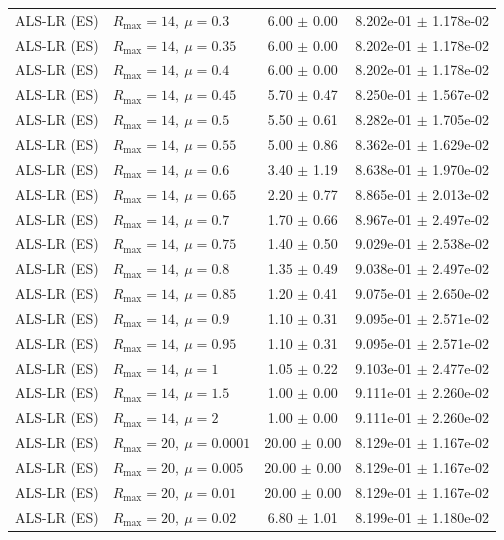 \begin{table}[t]
\begin{tabular}{@{}llcc@{}}
ALS-LR (ES) & \(R_{\max}=14,\ \mu=0.3\) & 6.00 $\pm$ 0.00 & 8.202e-01 $\pm$ 1.178e-02 \\
ALS-LR (ES) & \(R_{\max}=14,\ \mu=0.35\) & 6.00 $\pm$ 0.00 & 8.202e-01 $\pm$ 1.178e-02 \\
ALS-LR (ES) & \(R_{\max}=14,\ \mu=0.4\) & 6.00 $\pm$ 0.00 & 8.202e-01 $\pm$ 1.178e-02 \\
ALS-LR (ES) & \(R_{\max}=14,\ \mu=0.45\) & 5.70 $\pm$ 0.47 & 8.250e-01 $\pm$ 1.567e-02 \\
ALS-LR (ES) & \(R_{\max}=14,\ \mu=0.5\) & 5.50 $\pm$ 0.61 & 8.282e-01 $\pm$ 1.705e-02 \\
ALS-LR (ES) & \(R_{\max}=14,\ \mu=0.55\) & 5.00 $\pm$ 0.86 & 8.362e-01 $\pm$ 1.629e-02 \\
ALS-LR (ES) & \(R_{\max}=14,\ \mu=0.6\) & 3.40 $\pm$ 1.19 & 8.638e-01 $\pm$ 1.970e-02 \\
ALS-LR (ES) & \(R_{\max}=14,\ \mu=0.65\) & 2.20 $\pm$ 0.77 & 8.865e-01 $\pm$ 2.013e-02 \\
ALS-LR (ES) & \(R_{\max}=14,\ \mu=0.7\) & 1.70 $\pm$ 0.66 & 8.967e-01 $\pm$ 2.497e-02 \\
ALS-LR (ES) & \(R_{\max}=14,\ \mu=0.75\) & 1.40 $\pm$ 0.50 & 9.029e-01 $\pm$ 2.538e-02 \\
ALS-LR (ES) & \(R_{\max}=14,\ \mu=0.8\) & 1.35 $\pm$ 0.49 & 9.038e-01 $\pm$ 2.497e-02 \\
ALS-LR (ES) & \(R_{\max}=14,\ \mu=0.85\) & 1.20 $\pm$ 0.41 & 9.075e-01 $\pm$ 2.650e-02 \\
ALS-LR (ES) & \(R_{\max}=14,\ \mu=0.9\) & 1.10 $\pm$ 0.31 & 9.095e-01 $\pm$ 2.571e-02 \\
ALS-LR (ES) & \(R_{\max}=14,\ \mu=0.95\) & 1.10 $\pm$ 0.31 & 9.095e-01 $\pm$ 2.571e-02 \\
ALS-LR (ES) & \(R_{\max}=14,\ \mu=1\) & 1.05 $\pm$ 0.22 & 9.103e-01 $\pm$ 2.477e-02 \\
ALS-LR (ES) & \(R_{\max}=14,\ \mu=1.5\) & 1.00 $\pm$ 0.00 & 9.111e-01 $\pm$ 2.260e-02 \\
ALS-LR (ES) & \(R_{\max}=14,\ \mu=2\) & 1.00 $\pm$ 0.00 & 9.111e-01 $\pm$ 2.260e-02 \\
ALS-LR (ES) & \(R_{\max}=20,\ \mu=0.0001\) & 20.00 $\pm$ 0.00 & 8.129e-01 $\pm$ 1.167e-02 \\
ALS-LR (ES) & \(R_{\max}=20,\ \mu=0.005\) & 20.00 $\pm$ 0.00 & 8.129e-01 $\pm$ 1.167e-02 \\
ALS-LR (ES) & \(R_{\max}=20,\ \mu=0.01\) & 20.00 $\pm$ 0.00 & 8.129e-01 $\pm$ 1.167e-02 \\
ALS-LR (ES) & \(R_{\max}=20,\ \mu=0.02\) & 6.80 $\pm$ 1.01 & 8.199e-01 $\pm$ 1.180e-02 \\

\end{tabular}
\end{table}
